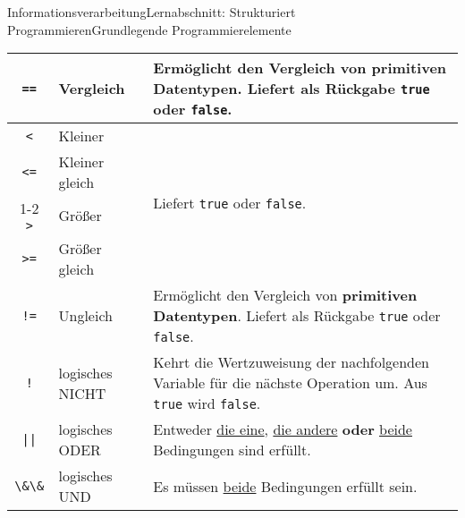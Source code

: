 \documentclass[11pt,oneside,openany,headings=optiontotoc,11pt,numbers=noenddot]{article}
\begin{document}
\begin{worksheet}{Informationsverarbeitung}{Lernabschnitt: Strukturiert Programmieren}{Grundlegende Programmierelemente}
\begin{tabularx}{\textwidth}{cXX}
			\hline
			{\lstinline[style=Python]{==}} & Vergleich & Ermöglicht den Vergleich von \textbf{primitiven Datentypen}. Liefert als Rückgabe {\lstinline[style=Python]{true}} oder {\lstinline[style=Python]{false}}.\\
			\hline
			{\lstinline[style=Python]{<}} & Kleiner & \multirow{4}{*}{Liefert {\lstinline[style=Python]{true}} oder {\lstinline[style=Python]{false}}.}\\
			\cline{1-2}
			{\lstinline[style=Python]{<=}} & Kleiner gleich & \\
			\cline{1-2}
			{\lstinline[style=Python]{>}} & Größer & \\
			\cline{1-2}
			{\lstinline[style=Python]{>=}} & Größer gleich & \\
			\hline
			{\lstinline[style=Python]{!=}} & Ungleich & Ermöglicht den Vergleich von \textbf{primitiven Datentypen}. Liefert als Rückgabe {\lstinline[style=Python]{true}} oder {\lstinline[style=Python]{false}}.\\
			\hline
			{\lstinline[style=Python]{!}} & logisches NICHT & Kehrt die Wertzuweisung der nachfolgenden Variable für die nächste Operation um. Aus {\lstinline[style=Python]{true}} wird {\lstinline[style=Python]{false}}.\\
			\hline
			{\lstinline[style=Python]{||}} & logisches ODER & Entweder \underline{die eine}, \underline{die andere} \textbf{oder} \underline{beide} Bedingungen sind erfüllt.\\
			\hline
			{\lstinline[style=Python]{\&\&}} & logisches UND & Es müssen \underline{beide} Bedingungen erfüllt sein.\\
			\hline
			\hline
		\end{tabularx}\\
		\par\noindent

\end{worksheet}
\end{document}
